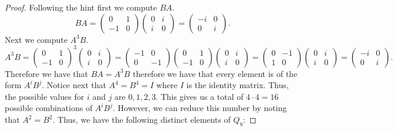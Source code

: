 \documentclass{article}
\begin{document}
\begin{proof}
    Following the hint first we compute $BA$.
    \[
        BA = \begin{pmatrix}
            0 & 1 \\
            -1 & 0
        \end{pmatrix} \begin{pmatrix}
            0 & i \\
            i & 0 
        \end{pmatrix}
         = \begin{pmatrix}
            -i & 0 \\
            0 & i
         \end{pmatrix}.
    \]
    Next we compute $A^3 B$.
    \[
         A^3 B = 
         \begin{pmatrix}
            0 & 1 \\
            -1 & 0 
         \end{pmatrix}^3 \begin{pmatrix}
            0 & i \\
            i & 0
         \end{pmatrix} = \begin{pmatrix}
            -1 & 0 \\
            0 & -1
         \end{pmatrix} \begin{pmatrix}
            0 & 1 \\
            -1 & 0 
         \end{pmatrix} \begin{pmatrix}
            0 & i \\
            i & 0
         \end{pmatrix}
          = \begin{pmatrix}
            0 & -1 \\
            1 & 0
          \end{pmatrix} \begin{pmatrix}
            0 & i \\
            i & 0
         \end{pmatrix}
         = \begin{pmatrix}
            -i & 0 \\
            0 & i 
         \end{pmatrix}.
    \]
    Therefore we have that $BA = A^3 B$ therefore we have that every element is of the form $A^iB^j$. Notice next that $A^4 = B^4 = I$ where $I$ is the identity matrix. Thus, the possible values for $i$ and $j$ are $0,1,2,3$. This gives us a total of $4 \cdot 4 = 16$ possible combinations of $A^i B^j$. However, we can reduce this number by noting that $A^2 = B^2$. Thus, we have the following distinct elements of $Q_8$:

\end{proof}
\end{document}
